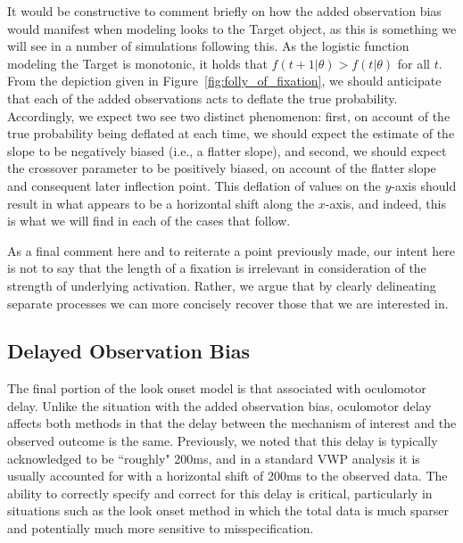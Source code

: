 \documentclass{article}
\begin{document}
It would be constructive to comment briefly on how the added observation bias would manifest when modeling looks to the Target object, as this is something we will see in a number of simulations following this. As the logistic function modeling the Target is monotonic, it holds that $f(t+1|\theta) > f(t | \theta)$ for all $t$. From the depiction given in Figure~\ref{fig:folly_of_fixation}, we should anticipate that each of the added observations acts to deflate the true probability. Accordingly, we expect two see two distinct phenomenon: first, on account of the true probability being deflated at each time, we should expect the estimate of the slope to be negatively biased (i.e., a flatter slope), and second, we should expect the crossover parameter to be positively biased, on account of the flatter slope and consequent later inflection point. This deflation of values on the $y$-axis should result in what appears to be a horizontal shift along the $x$-axis, and indeed, this is what we will find in each of the cases that follow.

As a final comment here and to reiterate a point previously made, our intent here is not to say that the length of a fixation is irrelevant in consideration of the strength of underlying activation. Rather, we argue that by clearly delineating separate processes we can more concisely recover those that we are interested in.  



\subsection{Delayed Observation Bias}


The final portion of the look onset model is that associated with oculomotor delay. Unlike the situation with the added observation bias, oculomotor delay affects both methods in that the delay between the mechanism of interest and the observed outcome is the same. Previously, we noted that this delay is typically acknowledged to be ``roughly" 200ms, and in a standard VWP analysis it is usually accounted for with a horizontal shift of 200ms to the observed data. The ability to correctly specify and correct for this delay is critical, particularly in situations such as the look onset method in which the total data is much sparser and potentially much more sensitive to misspecification. 
\end{document}
